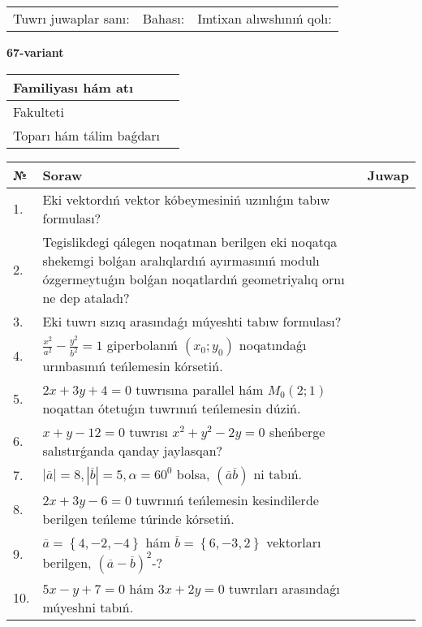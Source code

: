 \documentclass{article}
\begin{document}
\vspace{1cm}

\begin{tabular}{lll}
Tuwrı juwaplar sanı: \underline{\hspace{1.5cm}} & 
Bahası: \underline{\hspace{1.5cm}} & 
Imtixan alıwshınıń qolı: \underline{\hspace{2cm}} \\
\end{tabular}

\egroup

\newpage


\textbf{67-variant}\\

\bgroup
\def\arraystretch{1.6} %

\begin{tabular}{|m{5.7cm}|m{9.5cm}|}
\hline
Familiyası hám atı & \\
\hline
Fakulteti  & \\
\hline
Toparı hám tálim baǵdarı  & \\
\hline
\end{tabular}

\vspace{1cm}

\begin{tabular}{|m{0.7cm}|m{10cm}|m{4cm}|}
\hline
№ & Soraw & Juwap \\
\hline
1. & Eki vektordıń vektor kóbeymesiniń uzınlıǵın tabıw formulası? &  \\
\hline
2. & Tegislikdegi qálegen noqatınan berilgen eki noqatqa shekemgi bolǵan aralıqlardıń ayırmasınıń modulı ózgermeytuǵın bolǵan noqatlardıń geometriyalıq ornı ne dep ataladı? &  \\
\hline
3. & Eki tuwrı sızıq arasındaǵı múyeshti tabıw formulası? &  \\
\hline
4. & $\frac{x^2}{a^2}-\frac{y^2}{b^2}=1$ giperbolanıń $(x_0;y_0)$ noqatındaǵı urınbasınıń teńlemesin kórsetiń. &  \\
\hline
5. & $2x+3y+4=0$ tuwrısına parallel hám $M_{0} (2;1)$ noqattan ótetuǵın tuwrınıń teńlemesin dúziń. &  \\
\hline
6. & $x+y-12=0$ tuwrısı $x^{2}+y^{2}-2y=0$ sheńberge salıstırǵanda qanday jaylasqan? &  \\
\hline
7. & $\left| \overline{a} \right|=8, \left| \overline{b} \right|=5, \alpha=60^{0}$ bolsa, $( \overline{a}\overline{b} )$ ni tabıń. &  \\
\hline
8. & $2x+3y-6=0$ tuwrınıń teńlemesin kesindilerde berilgen teńleme túrinde kórsetiń. &  \\
\hline
9. & $\overline{a}=\left\{ 4,-2,-4 \right\}$ hám $\overline{b}=\left\{ 6,-3, 2 \right\}$ vektorları berilgen, $(\overline{a}-\overline{b}) ^{2}$-? &  \\
\hline
10. & $5x-y+7=0$ hám $3x+2y=0$ tuwrıları arasındaǵı múyeshni tabıń. &  \\
\hline
\end{tabular}
\end{document}
